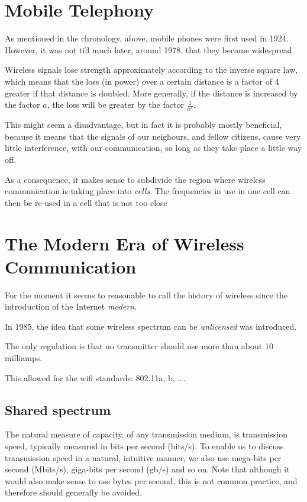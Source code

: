 \section{Mobile Telephony}

As mentioned in the chronology, above, mobile phones were first used in 1924. However,
it was not till much later, around 1978, that they became widespread. 

Wireless signals lose strength approximately according to the inverse square law,
which means that the loss (in power) over a certain distance is a factor of 4 greater
if that distance is doubled. More generally, if the distance is increased by the factor
$a$, the loss will be greater by the factor $\frac{1}{ a^2}$. 

This might seem a disadvantage, but in fact it is probably mostly beneficial, because it 
means that the signals of our neighours, and fellow citizens, cause very little interference,
with our communication, so long as they take place a little way off.

As a consequence, it makes sense to subdivide the region where wireless communication is taking
place into {\em cells}. The frequencies in use in one cell can then be re-used in a cell that
is not too close

\section{The Modern Era of Wireless Communication}

For the moment it seems to reasonable to call the history of wireless since the introduction 
of the Internet {\em modern}.

In 1985, the idea that some wireless spectrum can be {\em unlicensed} was introduced.

The only regulation is that no transmitter should use more than about 10 milliamps.

This allowed for the wifi standards: 802.11a, b, \dots.

\subsection{Shared spectrum}

The natural measure of capacity, of any transmission medium, is transmission speed, typically
measured in bits per second (bits/s). To enable us to discuss transmission speed in a 
natural, intuitive manner, we also use mega-bits per second (Mbits/s), giga-bits per second (gb/s)
and so on. Note that although it would also make sense to use bytes per second, this is not
common practice, and therefore should generally be avoided.

